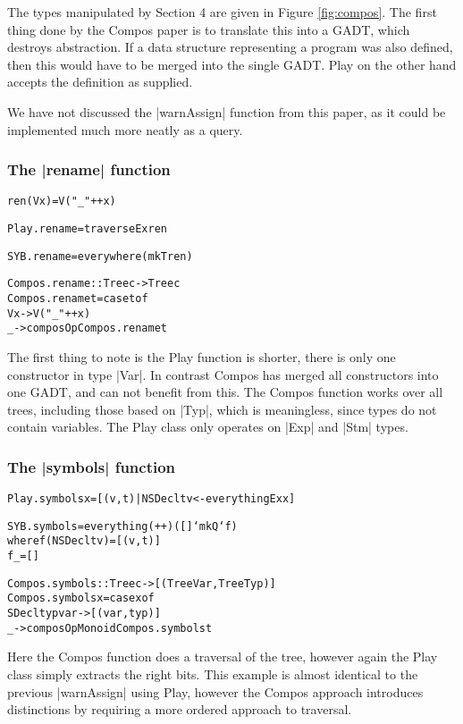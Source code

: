 \documentclass[preprint]{sigplanconf}
\newenvironment{code}{\begin{alltt}\small}{\end{alltt}}
\begin{document}
The types manipulated by Section 4 are given in Figure \ref{fig:compos}. The first thing done by the Compos paper is to translate this into a GADT, which destroys abstraction. If a data structure representing a program was also defined, then this would have to be merged into the single GADT. Play on the other hand accepts the definition as supplied.

We have not discussed the |warnAssign| function from this paper, as it could be implemented much more neatly as a query.

\subsubsection{The |rename| function}

\begin{code} %
ren (V x) = V ("_" ++ x)

Play.rename = traverseEx ren

SYB.rename = everywhere (mkT ren)

Compos.rename :: Tree c -> Tree c
Compos.rename t = case t of
    V x -> V ("_" ++ x)
    _   -> composOp Compos.rename t
\end{code}

The first thing to note is the Play function is shorter, there is only one constructor in type |Var|. In contrast Compos has merged all constructors into one GADT, and can not benefit from this. The Compos function works over all trees, including those based on |Typ|, which is meaningless, since types do not contain variables. The Play class only operates on |Exp| and |Stm| types.


\subsubsection{The |symbols| function}

\begin{code}
Play.symbols x = [(v,t) | NSDecl t v <- everythingEx x]

SYB.symbols = everything (++) ([] `mkQ` f)
    where  f (NSDecl t v)  = [(v,t)]
           f _             = []

Compos.symbols :: Tree c -> [(Tree Var, Tree Typ)]
Compos.symbols x = case x of
    SDecl typ var -> [(var,typ)]
    _ -> composOpMonoid Compos.symbols t
\end{code}

Here the Compos function does a traversal of the tree, however again the Play class simply extracts the right bits. This example is almost identical to the previous |warnAssign| using Play, however the Compos approach introduces distinctions by requiring a more ordered approach to traversal.
\end{document}
